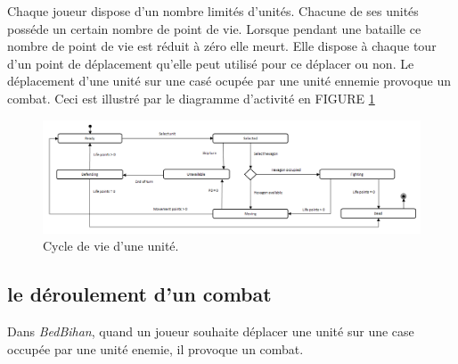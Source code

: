 	Chaque joueur dispose d'un nombre limités d'unités. Chacune de ses unités posséde un certain nombre de point de vie. Lorsque pendant une bataille ce nombre de point de vie est réduit à zéro elle meurt. Elle dispose à chaque tour d'un point de déplacement qu'elle peut utilisé pour ce déplacer ou non. Le déplacement d'une unité sur une casé ocupée par une unité ennemie provoque un combat. Ceci est illustré par le diagramme d'activité en FIGURE \ref{fig:arbre_exemple_1}


	\begin{figure}[h]
	            \centering
	            \includegraphics[width=1\textwidth]{figure/unit_life_cycle_state_diagram.png}
	            \caption{Cycle de vie d'une unité.}
	            \label{fig:arbre_exemple_1}
	\end{figure}

		\subsection{le déroulement d'un combat}


		Dans \emph{BedBihan}, quand un joueur souhaite déplacer une unité sur une case occupée par une unité enemie, il provoque un combat. 
